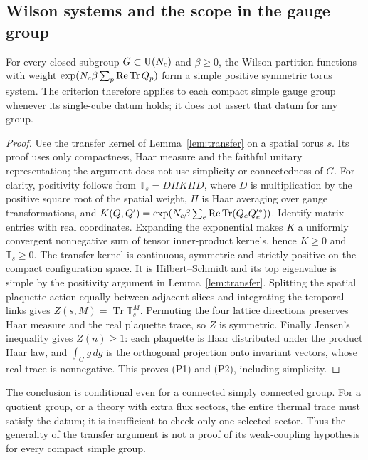 \subsection{Wilson systems and the scope in the gauge group}
\begin{proposition}\label{sc:prop:wilson}
For every closed subgroup $G\subset\mathrm{U}(N_c)$ and $\beta\ge0$, the Wilson
partition functions with weight
$\exp(N_c\beta\sum_p\operatorname{Re}\operatorname{Tr} Q_p)$ form a simple positive symmetric torus system.
The criterion therefore applies to each compact simple gauge group whenever
its single-cube datum holds; it does not assert that datum for any group.
\end{proposition}
\begin{proof}
Use the transfer kernel of Lemma~\ref{lem:transfer} on a spatial torus $s$.
Its proof uses only compactness, Haar measure and the faithful unitary
representation; the argument does not use simplicity or connectedness of $G$.
For clarity, positivity follows from $\mathbb T_s=D\Pi K\Pi D$, where $D$ is
multiplication by the positive square root of the spatial weight, $\Pi$ is
Haar averaging over gauge transformations, and
$K(Q,Q')=\exp(N_c\beta\sum_e\operatorname{Re}\operatorname{Tr}(Q_eQ_e'^*))$. Identify matrix entries with
real coordinates. Expanding the exponential makes $K$ a uniformly convergent
nonnegative sum of tensor inner-product kernels, hence $K\ge0$ and
$\mathbb T_s\ge0$. The transfer kernel is continuous, symmetric and strictly
positive on the compact configuration space. It is Hilbert--Schmidt and its
top eigenvalue is simple by the positivity argument in
Lemma~\ref{lem:transfer}. Splitting the spatial plaquette action equally
between adjacent slices and integrating the temporal links gives
$Z(s,M)=\operatorname{Tr}\mathbb T_s^M$. Permuting the four lattice directions
preserves Haar measure and the real plaquette trace, so $Z$ is symmetric.
Finally Jensen's inequality gives $Z(n)\ge1$: each plaquette is Haar distributed
under the product Haar law, and $\int_G g\,dg$ is the orthogonal projection
onto invariant vectors, whose real trace is nonnegative. This proves (P1)
and (P2), including simplicity.
\end{proof}

The conclusion is conditional even for a connected simply connected group.
For a quotient group, or a theory with extra flux sectors, the entire thermal
trace must satisfy the datum; it is insufficient to check only one selected
sector. Thus the generality of the transfer argument is not a proof of its
weak-coupling hypothesis for every compact simple group.

